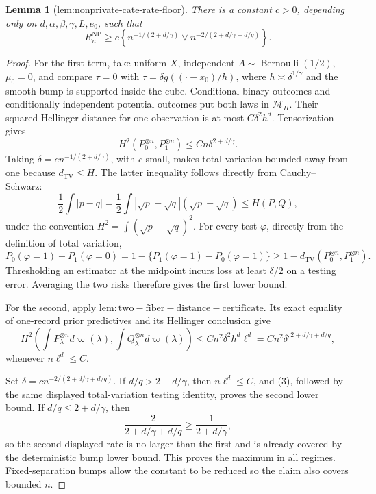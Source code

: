 \documentclass{article}
\newtheorem{lemma}{Lemma}
\begin{document}
\begin{lemma}[lem:nonprivate-cate-rate-floor]\label{lem:nonprivate-cate-rate-floor}
There is a constant \(c>0\), depending only on
\(d,\alpha,\beta,\gamma,L,e_0\), such that
\[
 R_n^{\mathrm{NP}}\ge c\left\{
 n^{-1/(2+d/\gamma)}\vee
 n^{-2/(2+d/\gamma+d/q)}\right\}.
\]
\end{lemma}
\begin{proof}
For the first term, take uniform \(X\), independent
\(A\sim\operatorname{Bernoulli}(1/2)\), \(\mu_0=0\), and compare
\(\tau=0\) with \(\tau=\delta g((\cdot-x_0)/h)\), where
\(h\asymp\delta^{1/\gamma}\) and the smooth bump is supported inside the
cube.  Conditional binary outcomes and conditionally independent potential
outcomes put both laws in \(\mathcal M_H\).  Their squared Hellinger distance
for one observation is at most \(C\delta^2h^d\).  Tensorization gives
\[
 H^2(P_0^{\otimes n},P_1^{\otimes n})\le Cn\delta^{2+d/\gamma}.
\]
Taking \(\delta=c n^{-1/(2+d/\gamma)}\), with \(c\) small, makes total
variation bounded away from one because
\(d_{\mathrm{TV}}\le H\).  The latter inequality follows directly from
Cauchy--Schwarz:
\[
 \frac12\int|p-q|
 =\frac12\int|\sqrt p-\sqrt q|(\sqrt p+\sqrt q)
 \le H(P,Q),
\]
under the convention \(H^2=\int(\sqrt p-\sqrt q)^2\).  For every test
\(\varphi\), directly from the
definition of total variation,
\[
 P_0(\varphi=1)+P_1(\varphi=0)
 =1-\{P_1(\varphi=1)-P_0(\varphi=1)\}
 \ge1-d_{\mathrm{TV}}(P_0^{\otimes n},P_1^{\otimes n}).
\]
Thresholding an estimator at the midpoint incurs loss at least
\(\delta/2\) on a testing error.  Averaging the two risks therefore gives
the first lower bound.

For the second, apply \(\mathrm{lem:two-fiber-distance-certificate}\).  Its
exact equality of one-record prior predictives and its Hellinger conclusion
give
\[
 H^2\!\left(\int P_\lambda^{\otimes n}d\varpi(\lambda),
              \int Q_\lambda^{\otimes n}d\varpi(\lambda)\right)
 \le Cn^2\delta^2h^d\ell^d
 =Cn^2\delta^{,2+d/\gamma+d/q}, \tag{3}
\]
whenever \(n\ell^d\le C\).

Set \(\delta=c n^{-2/(2+d/\gamma+d/q)}\).  If
\(d/q>2+d/\gamma\), then \(n\ell^d\le C\), and (3), followed by the same
displayed total-variation testing identity, proves the second lower bound.  If
\(d/q\le2+d/\gamma\), then
\[
 \frac{2}{2+d/\gamma+d/q}\ge\frac{1}{2+d/\gamma},
\]
so the second displayed rate is no larger than the first and is already
covered by the deterministic bump lower bound.  This proves the maximum in
all regimes.  Fixed-separation bumps allow the constant to be reduced so the
claim also covers bounded \(n\).
\end{proof}
\end{document}
